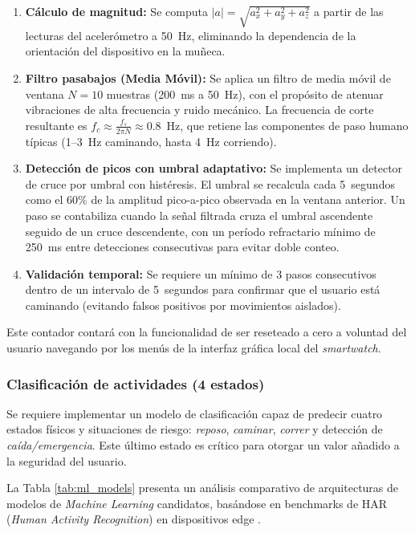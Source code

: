 \documentclass[letterpaper,11pt]{article}
\newcommand{\rtabla}[1]{Tabla \ref{#1}}
\begin{document}
\begin{enumerate}
    \item \textbf{Cálculo de magnitud:} Se computa $|a| = \sqrt{a_x^2 + a_y^2 + a_z^2}$ a partir de las lecturas del acelerómetro a 50~Hz, eliminando la dependencia de la orientación del dispositivo en la muñeca.
    \item \textbf{Filtro pasabajos (Media Móvil):} Se aplica un filtro de media móvil de ventana $N = 10$ muestras (200~ms a 50~Hz), con el propósito de atenuar vibraciones de alta frecuencia y ruido mecánico. La frecuencia de corte resultante es $f_c \approx \frac{f_s}{2\pi N} \approx 0.8$~Hz, que retiene las componentes de paso humano típicas (1--3~Hz caminando, hasta 4~Hz corriendo).
    \item \textbf{Detección de picos con umbral adaptativo:} Se implementa un detector de cruce por umbral con histéresis. El umbral se recalcula cada 5~segundos como el 60\% de la amplitud pico-a-pico observada en la ventana anterior. Un paso se contabiliza cuando la señal filtrada cruza el umbral ascendente seguido de un cruce descendente, con un período refractario mínimo de 250~ms entre detecciones consecutivas para evitar doble conteo.
    \item \textbf{Validación temporal:} Se requiere un mínimo de 3 pasos consecutivos dentro de un intervalo de 5~segundos para confirmar que el usuario está caminando (evitando falsos positivos por movimientos aislados).
\end{enumerate}

Este contador contará con la funcionalidad de ser reseteado a cero a voluntad del usuario navegando por los menús de la interfaz gráfica local del \textit{smartwatch}.

\subsubsection{Clasificación de actividades (4 estados)}

Se requiere implementar un modelo de clasificación capaz de predecir cuatro estados físicos y situaciones de riesgo: \textit{reposo}, \textit{caminar}, \textit{correr} y detección de \textit{caída/emergencia}. Este último estado es crítico para otorgar un valor añadido a la seguridad del usuario.

La \rtabla{tab:ml_models} presenta un análisis comparativo de arquitecturas de modelos de \textit{Machine Learning} candidatos, basándose en benchmarks de HAR (\textit{Human Activity Recognition}) en dispositivos edge \citep{har_tinyml}.
\end{document}
